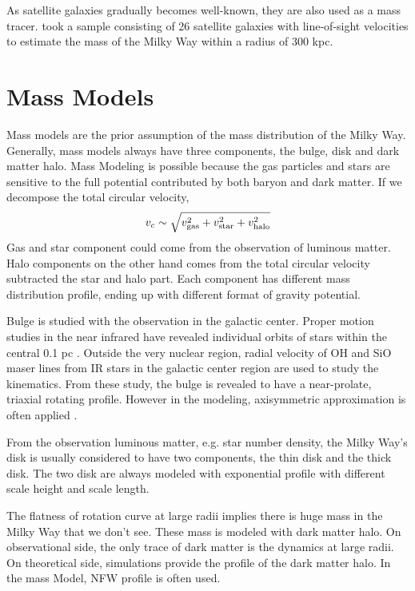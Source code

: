 \documentclass[preprint]{aastex}
\begin{document}
     As satellite galaxies gradually becomes well-known, they are also
used as a mass tracer. \citet{2010MNRAS.406..264W} took a sample consisting of 26
satellite galaxies with line-of-sight velocities to estimate the mass
of the Milky Way within a radius of 300 kpc.
     
\section{Mass Models}
Mass models are the prior assumption of the
mass distribution of the Milky Way. Generally, mass models always have
three components, the bulge, disk and dark matter halo. Mass Modeling
is possible because the gas particles and stars are sensitive to the
full potential contributed by both baryon and dark matter. If we
decompose the total circular velocity,
     \begin{equation} v_{c} \sim \sqrt{v_{\rm gas}^{2}+v_{\rm
star}^{2} + v_{\rm halo}^{2}}
     \end{equation} Gas and star component could come from the
observation of luminous matter. Halo components on the other hand
comes from the total circular velocity subtracted the star and halo
part. Each component has different mass distribution profile, ending
up with different format of gravity potential.

     Bulge is studied with the observation in the galactic
center. Proper motion studies in the near infrared have revealed
individual orbits of stars within the central 0.1 pc
\cite{2013pss5.book..985S}. Outside the very nuclear region, radial velocity of
OH and SiO maser lines from IR stars in the galactic center region are
used to study the kinematics. From these study, the bulge is revealed
to have a near-prolate, triaxial rotating profile. However in the
modeling, axisymmetric approximation is often
applied \cite{2011MNRAS.414.2446M}.

     From the observation luminous matter, e.g. star number density,
the Milky Way's disk is usually considered to have two components, the
thin disk and the thick disk. The two disk are always modeled with
exponential profile with different scale height and scale length.

     The flatness of rotation curve at large radii implies there is
huge mass in the Milky Way that we don't see. These mass is modeled
with dark matter halo. On observational side, the only trace of dark
matter is the dynamics at large radii. On theoretical side,
simulations provide the profile of the dark matter halo. In the mass
Model, NFW profile is often used.
\end{document}
